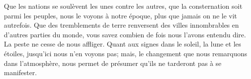 Que les nations se soulèvent les unes contre les autres,
	que la consternation soit parmi les peuples,
	nous le voyons à notre époque, plus que jamais on ne le vit autrefois.
Que des tremblements de terre renversent des villes innombrables
		en d’autres parties du monde,
	vous savez combien de fois nous l’avons entendu dire.
La peste ne cesse de nous affliger.
Quant aux signes dans le soleil, la lune et les étoiles,
	jusqu’ici nous n’en voyons pas;
	mais, le changement que nous remarquons dans l’atmosphère,
	nous permet de présumer qu’ils ne tarderont pas à se manifester.
